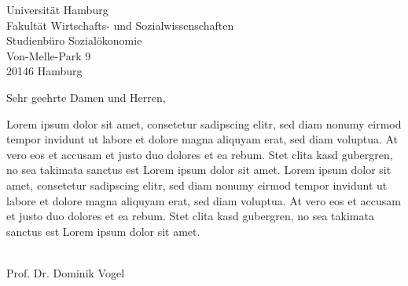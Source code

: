 \documentclass[]{uhhbrief-fak2}
\date{\today}
\begin{document}
\begin{letter}{
	Universität Hamburg \\
	Fakultät Wirtschafts- und Sozialwissenschaften\\
	Studienbüro Sozialökonomie\\
	Von-Melle-Park 9\\
	20146 Hamburg
		}

\subject{Betreff}

\opening{Sehr geehrte Damen und Herren,}

Lorem ipsum dolor sit amet, consetetur sadipscing elitr, sed diam nonumy eirmod tempor invidunt ut labore et dolore magna aliquyam erat, sed diam voluptua. At vero eos et accusam et justo duo dolores et ea rebum. Stet clita kasd gubergren, no sea takimata sanctus est Lorem ipsum dolor sit amet. Lorem ipsum dolor sit amet, consetetur sadipscing elitr, sed diam nonumy eirmod tempor invidunt ut labore et dolore magna aliquyam erat, sed diam voluptua. At vero eos et accusam et justo duo dolores et ea rebum. Stet clita kasd gubergren, no sea takimata sanctus est Lorem ipsum dolor sit amet.


\closing{~\\ \vspace*{1cm} Prof. Dr. Dominik Vogel}






\end{letter}
\end{document}
